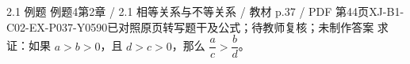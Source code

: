 \par\noindent\begin{minipage}{\linewidth}
\begin{bankitem}{2.1 例题 例题4}{第2章 / 2.1 相等关系与不等关系 / 教材 p.37 / PDF 第44页}{XJ-B1-C02-EX-P037-Y0590}{已对照原页转写题干及公式；待教师复核；未制作答案}
求证：如果 $a>b>0$，且 $d>c>0$，那么 $\dfrac ac>\dfrac bd$。
\end{bankitem}
\end{minipage}\par\medskip
